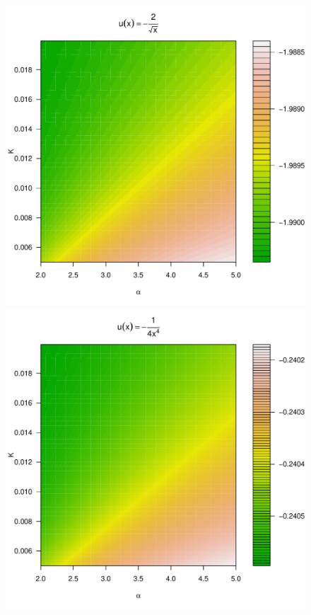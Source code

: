 \begin{figure}[htb!]
  \begin{minipage}{0.25\linewidth}
    \includegraphics[width=\textwidth]{preference_pareto5e-1_A.pdf}
  \end{minipage}\hfill
  \begin{minipage}{0.25\linewidth}
    \includegraphics[width=\textwidth]{preference_pareto4_A.pdf}

\end{minipage}
\end{figure}
